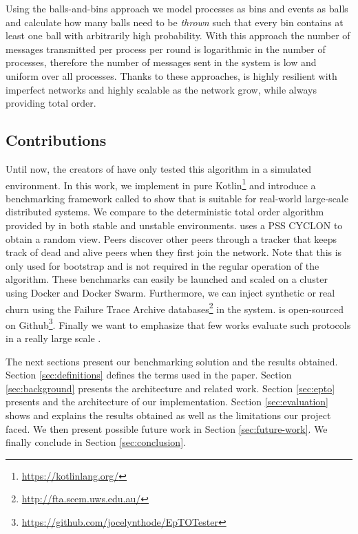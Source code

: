 \par
Using the balls-and-bins approach we model processes as bins and events as balls and calculate how many balls need to be \textit{thrown} such that every bin contains at least one ball with arbitrarily high probability. With this approach the number of messages transmitted per process per round is logarithmic in the number of processes, therefore the number of messages sent in the system is low and uniform over all processes. Thanks to these approaches, \epto is highly resilient with  imperfect networks and highly scalable as the network grow, while always providing total order.
\subsection{Contributions}
Until now, the creators of \epto have only tested this algorithm in a simulated environment. In this work, we implement \epto in pure Kotlin\footnote{\href{https://kotlinlang.org/}{https://kotlinlang.org/}} and introduce a benchmarking framework called \sys to show that \epto is suitable for real-world large-scale distributed systems. We compare \epto to the deterministic total order algorithm provided by \jgroups \autocite{jgroups} in both stable and unstable environments. \epto uses a PSS CYCLON \autocite{Voulgaris2005} to obtain a random view. 
Peers discover other peers through a tracker that keeps track of dead and alive peers when they first join the network.
Note that this is only used for bootstrap and is not required in the regular operation of the algorithm.
These benchmarks can easily be launched and scaled on a cluster using Docker and Docker Swarm. Furthermore, we can inject synthetic or real churn using the Failure Trace Archive databases\footnote{\href{http://fta.scem.uws.edu.au/}{http://fta.scem.uws.edu.au/}} in the system. \sys is open-sourced on Github\footnote{\href{https://github.com/jocelynthode/EpTOTester}{https://github.com/jocelynthode/EpTOTester}}. Finally we want to emphasize that few works evaluate such protocols in a really large scale \autocites[]{Chandra2007}[]{Maia2011}.
\par
The next sections present our benchmarking solution and the results obtained. Section \ref{sec:definitions} defines the terms used in the paper. Section \ref{sec:background} presents the \epto architecture and related work. Section \ref{sec:epto} presents \sys and the architecture of our implementation. Section \ref{sec:evaluation} shows and explains the results obtained as well as the limitations our project faced. We then present possible future work in Section \ref{sec:future-work}. We finally conclude in Section \ref{sec:conclusion}.
